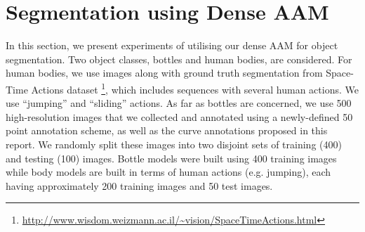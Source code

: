 \section{Segmentation using Dense AAM}
\label{sec:segmentation}

In this section, we present experiments of utilising our dense AAM for object segmentation. Two object classes, bottles and human bodies, are considered. For human bodies, we use images along with ground truth segmentation from Space-Time Actions dataset \footnote{\label{sta} \url{http://www.wisdom.weizmann.ac.il/~vision/SpaceTimeActions.html}}, which includes sequences with several human actions. We use ``jumping'' and ``sliding'' actions. As far as bottles are concerned, we use 500 high-resolution images that we collected and annotated using a newly-defined 50 point annotation scheme, as well as the curve annotations proposed in this report. We randomly split these images into two disjoint sets of training (400) and testing (100) images. Bottle models were built using 400 training images while body models are built in terms of human actions (e.g. jumping), each having approximately 200 training images and 50 test images. 

